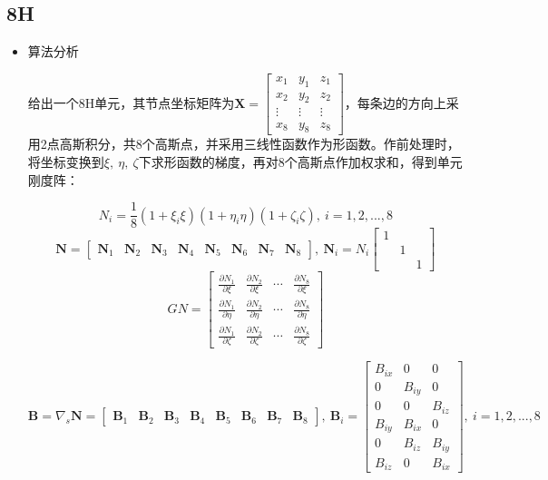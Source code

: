 \documentclass[UTF8]{ctexbook}
\begin{document}
\subsection{8H}

\begin{itemize}
\item 算法分析

给出一个8H单元，其节点坐标矩阵为$\boldsymbol{X}=\begin{bmatrix}x_{1} & y_{1} & z_{1}\\
x_{2} & y_{2} & z_{2}\\
\vdots & \vdots & \vdots\\
x_{8} & y_{8} & z_{8}
\end{bmatrix}$，每条边的方向上采用2点高斯积分，共8个高斯点，并采用三线性函数作为形函数。作前处理时，将坐标变换到$\xi,\ \eta,\ \zeta$下求形函数的梯度，再对8个高斯点作加权求和，得到单元刚度阵：


\[
N_{i}=\frac{1}{8}(1+\xi_{i}\xi)(1+\eta_{i}\eta)(1+\zeta_{i}\zeta),\ i=1,2,...,8
\]
\[
\boldsymbol{N}=\begin{bmatrix}\boldsymbol{N}_{1} & \boldsymbol{N}_{2} & \boldsymbol{N}_{3} & \boldsymbol{N}_{4} & \boldsymbol{N}_{5} & \boldsymbol{N}_{6} & \boldsymbol{N}_{7} & \boldsymbol{N}_{8}\end{bmatrix},\ \boldsymbol{N}_{i}=N_{i}\begin{bmatrix}1\\
 & 1\\
 &  & 1
\end{bmatrix}
\]
\[
GN=\begin{bmatrix}\frac{\partial N_{1}}{\partial\xi} & \frac{\partial N_{2}}{\partial\xi} & \cdots & \frac{\partial N_{8}}{\partial\xi}\\
\frac{\partial N_{1}}{\partial\eta} & \frac{\partial N_{2}}{\partial\eta} & \cdots & \frac{\partial N_{8}}{\partial\eta}\\
\frac{\partial N_{1}}{\partial\zeta} & \frac{\partial N_{2}}{\partial\zeta} & \cdots & \frac{\partial N_{8}}{\partial\zeta}
\end{bmatrix}
\]



\[
\boldsymbol{B}=\nabla_{s}\boldsymbol{N}=\begin{bmatrix}\boldsymbol{B}_{1} & \boldsymbol{B}_{2} & \boldsymbol{B}_{3} & \boldsymbol{B}_{4} & \boldsymbol{B}_{5} & \boldsymbol{B}_{6} & \boldsymbol{B}_{7} & \boldsymbol{B}_{8}\end{bmatrix},\ \boldsymbol{B}_{i}=\begin{bmatrix}B_{ix} & 0 & 0\\
0 & B_{iy} & 0\\
0 & 0 & B_{iz}\\
B_{iy} & B_{ix} & 0\\
0 & B_{iz} & B_{iy}\\
B_{iz} & 0 & B_{ix}
\end{bmatrix},\ i=1,2,...,8
\]




\end{itemize}
\end{document}
